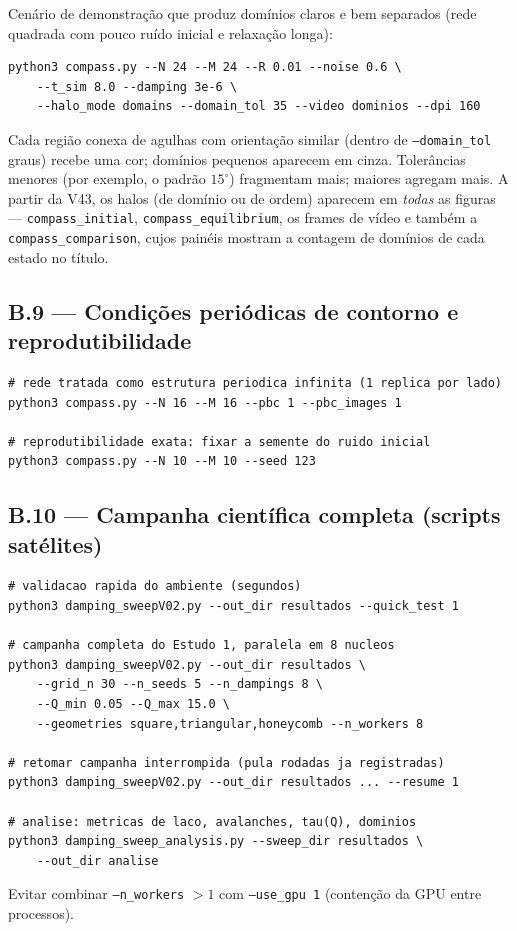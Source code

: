 \documentclass[11pt,a4paper]{article}
\newcommand{\code}[1]{\texttt{#1}}
\begin{document}
Cenário de demonstração que produz domínios claros e bem separados
(rede quadrada com pouco ruído inicial e relaxação longa):
\begin{verbatim}
python3 compass.py --N 24 --M 24 --R 0.01 --noise 0.6 \
    --t_sim 8.0 --damping 3e-6 \
    --halo_mode domains --domain_tol 35 --video dominios --dpi 160
\end{verbatim}
Cada região conexa de agulhas com orientação similar (dentro de
\code{--domain\_tol} graus) recebe uma cor; domínios pequenos aparecem
em cinza. Tolerâncias menores (por exemplo, o padrão $15^\circ$)
fragmentam mais; maiores agregam mais. A partir da V43, os halos
(de domínio ou de ordem) aparecem em \emph{todas} as figuras —
\code{compass\_initial}, \code{compass\_equilibrium}, os frames de
vídeo e também a \code{compass\_comparison}, cujos painéis mostram a
contagem de domínios de cada estado no título.

\subsection*{B.9 --- Condições periódicas de contorno e
reprodutibilidade}

\begin{verbatim}
# rede tratada como estrutura periodica infinita (1 replica por lado)
python3 compass.py --N 16 --M 16 --pbc 1 --pbc_images 1

# reprodutibilidade exata: fixar a semente do ruido inicial
python3 compass.py --N 10 --M 10 --seed 123
\end{verbatim}

\subsection*{B.10 --- Campanha científica completa (scripts satélites)}

\begin{verbatim}
# validacao rapida do ambiente (segundos)
python3 damping_sweepV02.py --out_dir resultados --quick_test 1

# campanha completa do Estudo 1, paralela em 8 nucleos
python3 damping_sweepV02.py --out_dir resultados \
    --grid_n 30 --n_seeds 5 --n_dampings 8 \
    --Q_min 0.05 --Q_max 15.0 \
    --geometries square,triangular,honeycomb --n_workers 8

# retomar campanha interrompida (pula rodadas ja registradas)
python3 damping_sweepV02.py --out_dir resultados ... --resume 1

# analise: metricas de laco, avalanches, tau(Q), dominios
python3 damping_sweep_analysis.py --sweep_dir resultados \
    --out_dir analise
\end{verbatim}
Evitar combinar \code{--n\_workers} $> 1$ com \code{--use\_gpu 1}
(contenção da GPU entre processos).
\end{document}
